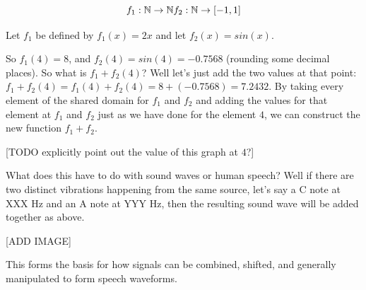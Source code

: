 \documentclass[UTF8]{book}
\begin{document}
\begin{CJK}{UTF8}{gbsn}
\[

f_{1}: \mathbb{N} \rightarrow \mathbb{N} \\
f_{2}: \mathbb{N} \rightarrow [-1,1] \\

\]

Let $f_{1}$ be defined by $f_{1}(x) = 2x$ and let $f_{2}(x) = sin(x)$.



So $f_{1}(4) = 8$, and $f_{2}(4) = sin(4) = -0.7568$ (rounding some decimal places). So what is $f_{1} + f_{2}(4)$? Well let's just add the two values at that point: $f_{1} + f_{2}(4) = f_{1}(4) + f_{2}(4) = 8 + (-0.7568) = 7.2432$. By taking every element of the shared domain for $f_{1}$ and $f_{2}$ and adding the values for that element at $f_{1}$ and $f_{2}$ just as we have done for the element $4$, we can construct the new function $f_{1}+f_{2}$.


[TODO explicitly point out the value of this graph at $4$?]

What does this have to do with sound waves or human speech? Well if there are two distinct vibrations happening from the same source, let's say a C note at XXX Hz and an A note at YYY Hz, then the resulting sound wave will be added together as above.

[ADD IMAGE]

This forms the basis for how signals can be combined, shifted, and generally manipulated to form speech waveforms.


\end{CJK}
\end{document}
